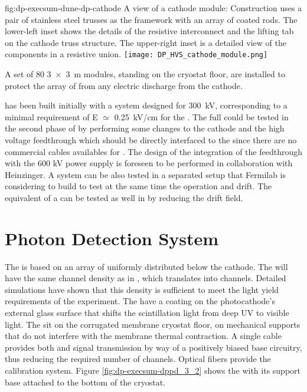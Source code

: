 \begin{dunefigure}{fig:dp-execsum-dune-dp-cathode}
{A view of a  cathode module:  Construction uses a pair of stainless steel trusses as the framework with an array of coated  rods. 
The lower-left inset shows the details of the resistive interconnect and the lifting tab on the cathode truss structure. The upper-right inset is a detailed view of the components in a resistive union.}
\texttt{[image: DP\_HVS\_cathode\_module.png]}
\end{dunefigure}

A set of 80 \SI{3x3}{m} %
 modules, standing on the cryostat floor, are installed to protect the array of  from any electric discharge from the cathode.

  has been built initially with a   system designed for \SI{300}{kV}, corresponding to a minimal requirement of E ${\simeq}$ \SI{0.25}{kV/cm} for the . The full  \dptargetdriftvoltpos could be tested in the second phase of   by performing some changes to the cathode and the high voltage feedthrough which should be directly interfaced to the    since there are no commercial cables availables for \dptargetdriftvoltpos. The design of the integration of the   feedthrough with the 600 kV power supply is foreseen to be performed in collaboration with Heinzinger. A \dptargetdriftvoltpos  {} system can be also tested in a separated setup that Fermilab is considering to build to test at the same time the \dptargetdriftvoltpos operation and \dpmaxdrift drift. The equivalent of a \dpmaxdrift can be tested as well in   by reducing the drift field.




\section{Photon Detection System}
\label{sec:dp-execsum-pd}

The  is based on an array of  uniformly distributed below the cathode. 
The   will have the same  channel density as in , which translates into \dpnumpmtch channels. Detailed simulations have shown that this density is sufficient to meet the light yield requirements of the
experiment. 
The  have a  coating on the photocathode's external glass surface that shifts the scintillation light from deep UV to visible light. The   sit on the corrugated membrane cryostat floor, on 
mechanical supports that do not interfere with the membrane thermal contraction. 
A single cable provides both  and signal transmission by way of a positively biased base circuitry, thus reducing the required number of \fdth{} channels. Optical fibers provide the calibration system.   Figure \ref{fig:dp-execsum-dppd_3_2} shows the  with its support base attached to the bottom of the  cryostat.


